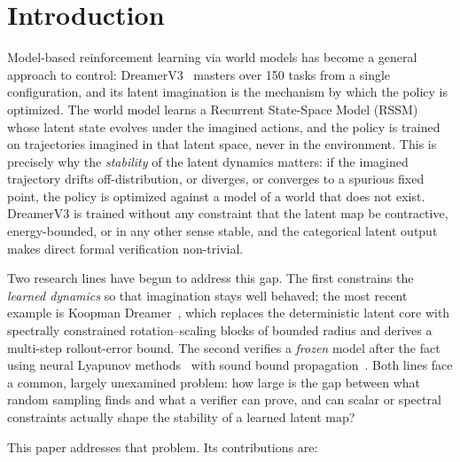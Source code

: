 \documentclass[journal]{IEEEtran}
\begin{document}
\section{Introduction}

Model-based reinforcement learning via world models has become a general
approach to control: DreamerV3~\cite{hafner2025nature,hafner2023arxiv}
masters over 150 tasks from a single configuration, and its latent
imagination is the mechanism by which the policy is optimized. The world model
learns a Recurrent State-Space Model (RSSM)~\cite{hafner2019icml} whose latent
state evolves under the imagined actions, and the policy is trained on
trajectories imagined in that latent space, never in the environment. This is
precisely why the \emph{stability} of the latent dynamics matters: if the
imagined trajectory drifts off-distribution, or diverges, or converges to a
spurious fixed point, the policy is optimized against a model of a world that
does not exist. DreamerV3 is trained without any constraint that the latent
map be contractive, energy-bounded, or in any other sense stable, and the
categorical latent output makes direct formal verification non-trivial.

Two research lines have begun to address this gap. The first constrains the
\emph{learned dynamics} so that imagination stays well behaved; the most
recent example is Koopman Dreamer~\cite{koopman2026}, which replaces the
deterministic latent core with spectrally constrained rotation--scaling
blocks of bounded radius and derives a multi-step rollout-error bound. The
second verifies a \emph{frozen} model after the fact using neural Lyapunov
methods~\cite{chang2019,dawson2023} with sound bound
propagation~\cite{zhang2018crown,xu2020autolirpa}. Both lines face a common,
largely unexamined problem: how large is the gap between what random sampling
finds and what a verifier can prove, and can scalar or spectral constraints
actually shape the stability of a learned latent map?

This paper addresses that problem. Its contributions are:
\end{document}
